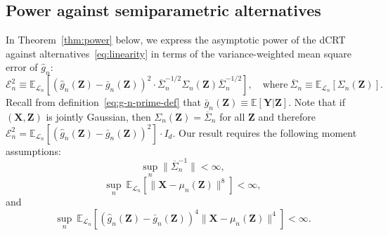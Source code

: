\documentclass[ejs]{imsart}
\numberwithin{equation}{section}
\theoremstyle{plain}
\theoremstyle{definition}
\theoremstyle{remark}
\newcommand{\prx}{\bm X}
\newcommand{\prz}{\bm Z}
\newcommand{\pry}{{\bm Y}}
\begin{document}
\subsection{Power against semiparametric alternatives} \label{sec:power-results}

In Theorem~\ref{thm:power} below, we express the asymptotic power of the dCRT against alternatives~\eqref{eq:linearity} in terms of the variance-weighted mean square  error of $\widehat g_n$:
\begin{equation} 
	\mathcal E^2_n \equiv  \mathbb E_{\mathcal L_n}\left[(\widehat g_n(\prz)-\bar g_n(\prz))^2 \cdot \overline \Sigma_n^{-1/2}\Sigma_n(\prz)\overline \Sigma_n^{-1/2}\right], \quad \text{where} \ \overline \Sigma_n\equiv \mathbb E_{\mathcal L_n}[\Sigma_n(\prz)].
\end{equation}
Recall from definition~\eqref{eq:g-n-prime-def} that $\bar g_n(\prz) \equiv \mathbb E[\pry|\prz]$. Note that if $(\prx, \prz)$ is jointly Gaussian, then $\Sigma_n(\prz) = \overline \Sigma_n$ for all $\prz$ and therefore $\mathcal E_n^2 = \mathbb E_{\mathcal L_n}[(\widehat g_n(\prz)-\bar g_n(\prz))^2] \cdot I_d$. Our result requires the following moment assumptions:
	\begin{equation}
\sup_{n} \|\overline \Sigma_n^{-1}\| < \infty,
\label{eq:s-n-inverse-assump}
\end{equation}
\begin{equation}
	\sup_n\ \mathbb E_{\mathcal L_n}[\|\prx - \mu_n(\prz)\|^8] < \infty,
	\label{eq:eighth-moment-assump-1}
\end{equation}
and
\begin{equation}
	\sup_n\ \mathbb E_{\mathcal L_n}[(\widehat g_n(\prz)-\bar g_n(\prz))^4\|\prx - \mu_n(\prz)\|^4] < \infty.
	\label{eq:eighth-moment-assump-2}
\end{equation}
\end{document}
